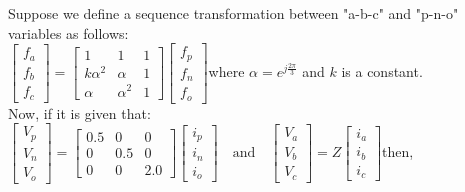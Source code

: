     \item Suppose we define a sequence transformation between "a-b-c" and "p-n-o" variables as follows:\\$\begin{bmatrix}f_a \\f_b \\f_c\end{bmatrix}=\begin{bmatrix}1 & 1 & 1 \\k\alpha^2 & \alpha & 1 \\\alpha & \alpha^2 & 1\end{bmatrix}\begin{bmatrix}f_p \\f_n \\f_o\end{bmatrix}$where $ \alpha = e^{j\frac{2\pi}{3}} $ and $ k $ is a constant.\\Now, if it is given that:$\begin{bmatrix}V_p \\V_n \\V_o\end{bmatrix}=\begin{bmatrix}
    0.5 & 0 & 0 \\
    0 & 0.5 & 0 \\
    0 & 0 & 2.0
    \end{bmatrix}\begin{bmatrix}i_p \\i_n \\i_o\end{bmatrix}\quad \text{and} \quad\begin{bmatrix}V_a \\V_b \\V_c\end{bmatrix}= Z\begin{bmatrix}i_a \\i_b \\i_c\end{bmatrix}$then,
